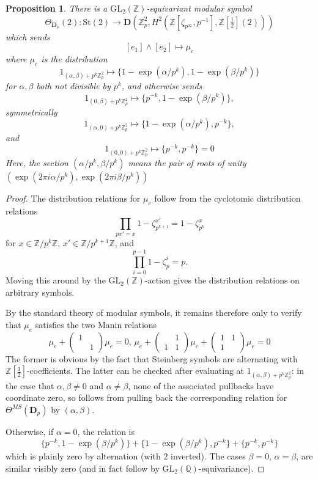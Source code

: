 \documentclass[10pt]{amsart}
\newtheorem{prop}[thm]{Proposition}
\theoremstyle{definition}
\newcommand{\Z}{\mathbb{Z}}
\newcommand{\Q}{\mathbb{Q}}
\newcommand{\D}{\mathbf{D}}
\newcommand{\St}{\mathrm{St}}
\newcommand{\GL}{\mathrm{GL}}
\numberwithin{equation}{section}
\begin{document}
    \begin{prop}
        There is a $\GL_2(\Z)$-equivariant modular symbol
        \[
        \Theta_{\D_p}(2): \St(2)\to \D(\Z_p^2, H^2(\Z[\zeta_{p^\infty}, p^{-1}], \Z[\tfrac{1}{2}](2)))
        \]
        which sends
        \[
        [e_1]\wedge [e_2] \mapsto \mu_e
        \]
        where $\mu_e$ is the distribution
        \[
        1_{(\alpha, \beta)+p^k\Z_p^2}\mapsto  \{1-\exp(\alpha/p^k), 1-\exp(\beta/p^k)\} 
        \]
        for $\alpha,\beta$ both not divisible by $p^k$, and otherwise sends
        \[
        1_{(0, \beta)+p^k\Z_p^2} \mapsto \{p^{-k}, 1-\exp(\beta/p^k)\},
        \]
        symmetrically 
        \[
        1_{(\alpha,0)+p^k\Z_p^2} \mapsto \{1-\exp(\alpha/p^k), p^{-k}\},
        \]      
        and 
        \[
        1_{(0, 0)+p^k\Z_p^2} \mapsto \{p^{-k}, p^{-k}\} = 0
        \]
        Here, the section $(\alpha/p^k,\beta/p^k)$ means the pair of roots of unity $(\exp(2\pi i \alpha/p^k),\exp(2\pi i \beta/p^k))$
    \end{prop}
    \begin{proof}
        The distribution relations for $\mu_e$ follow from the cyclotomic distribution relations
        \[
            \prod_{p x' = x} 1-\zeta_{p^{k+1}}^{x'} = 1-\zeta_{p^k}^x
        \]
        for $x\in \Z/p^k\Z$, $x'\in \Z/p^{k+1}\Z$, and 
        \[
            \prod_{i=0}^{p-1} 1-\zeta_p^i = p.
        \]
        Moving this around by the $\GL_2(\Z)$-action gives the distribution relations on arbitrary symbols.
        
        By the standard theory of modular symbols, it remains therefore only to verify that $\mu_e$ satisfies the two Manin relations
        \[
        \mu_e + \begin{pmatrix}1&\\ &1 \end{pmatrix}\mu_e = 0,\, \mu_e + \begin{pmatrix}&1\\ 1&1 \end{pmatrix} \mu_e + \begin{pmatrix}1&1\\1&\end{pmatrix}\mu_e=0
        \]
        The former is obvious by the fact that Steinberg symbols are alternating with $\Z[\frac{1}{2}]$-coefficients. The latter can be checked after evaluating at $1_{(\alpha, \beta)+p^k\Z_p^2}$: in the case that $\alpha,\beta\ne 0$ and $\alpha \ne \beta$, none of the associated pullbacks have coordinate zero, so follows from pulling back the corresponding relation for $\Theta^{MS}(\D_p)$ by $(\alpha,\beta)$. 
        
        Otherwise, if $\alpha=0$, the relation is
        \[
        \{p^{-k}, 1-\exp(\beta/p^k)\} + \{1-\exp(\beta/p^k), p^{-k}\}+\{p^{-k},p^{-k}\}
        \]
        which is plainly zero by alternation (with $2$ inverted). The cases $\beta=0$, $\alpha=\beta$, are similar visibly zero (and in fact follow by $\GL_2(\Q)$-equivariance).
    \end{proof}
\end{document}

